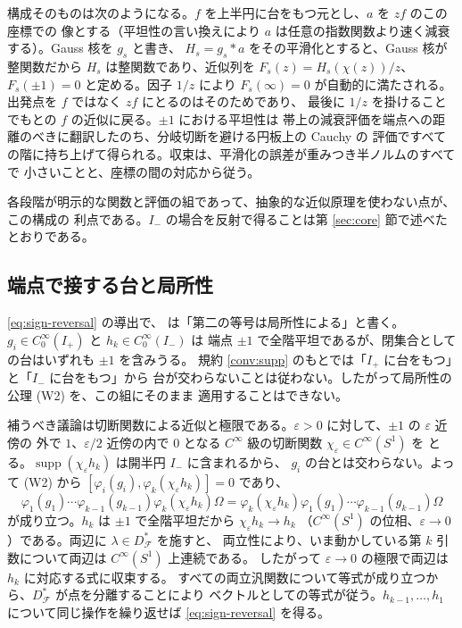 \documentclass[11pt,a4paper]{article}
\newcommand{\Circ}{S^{1}}
\newcommand{\Fields}{\mathcal{F}}
\newcommand{\Dom}{D}
\newcommand{\Dstar}{\Dom^{*}_{\Fields}}
\theoremstyle{definition}
\begin{document}
構成そのものは次のようになる。$f$ を上半円に台をもつ元とし、$a$ を $zf$ のこの座標での
像とする（平坦性の言い換えにより $a$ は任意の指数関数より速く減衰する）。Gauss 核を $g_s$ と書き、
$H_s = g_s * a$ をその平滑化とすると、Gauss 核が整関数だから $H_s$ は整関数であり、近似列を
$F_s(z) = H_s(\chi(z))/z$、$F_s(\pm 1) = 0$ と定める。因子 $1/z$ により
$F_s(\infty) = 0$ が自動的に満たされる。出発点を $f$ ではなく $zf$ にとるのはそのためであり、
最後に $1/z$ を掛けることでもとの $f$ の近似に戻る。$\pm 1$ における平坦性は
帯上の減衰評価を端点への距離のべきに翻訳したのち、分岐切断を避ける円板上の Cauchy の
評価ですべての階に持ち上げて得られる。収束は、平滑化の誤差が重みつき半ノルムのすべてで
小さいことと、座標の間の対応から従う。

各段階が明示的な関数と評価の組であって、抽象的な近似原理を使わない点が、この構成の
利点である。$I_-$ の場合を反射で得ることは第 \ref{sec:core} 節で述べたとおりである。

\subsection{端点で接する台と局所性}
\label{sec:locality}

\eqref{eq:sign-reversal} の導出で、\cite{T26} は「第二の等号は局所性による」と書く。
$g_i \in C_0^\infty(I_+)$ と $h_k \in C_0^\infty(I_-)$ は
端点 $\pm 1$ で全階平坦であるが、閉集合としての台はいずれも $\pm 1$ を含みうる。
規約 \ref{conv:supp} のもとでは「$I_+$ に台をもつ」と「$I_-$ に台をもつ」から
台が交わらないことは従わない。したがって局所性の公理 (W2) を、この組にそのまま
適用することはできない。

補うべき議論は切断関数による近似と極限である。$\varepsilon > 0$ に対して、$\pm 1$ の $\varepsilon$ 近傍の
外で $1$、$\varepsilon/2$ 近傍の内で $0$ となる $C^\infty$ 級の切断関数 $\chi_\varepsilon \in C^\infty(\Circ)$ を
とる。$\operatorname{supp}(\chi_\varepsilon h_k)$ は開半円 $I_-$ に含まれるから、
$g_i$ の台とは交わらない。よって (W2) から
$[\varphi_i(g_i), \varphi_k(\chi_\varepsilon h_k)] = 0$ であり、
\[
  \varphi_1(g_1)\cdots\varphi_{k-1}(g_{k-1})\varphi_k(\chi_\varepsilon h_k)\Omega
  = \varphi_k(\chi_\varepsilon h_k)\varphi_1(g_1)\cdots\varphi_{k-1}(g_{k-1})\Omega
\]
が成り立つ。$h_k$ は $\pm 1$ で全階平坦だから $\chi_\varepsilon h_k \to h_k$
（$C^\infty(\Circ)$ の位相、$\varepsilon \to 0$）である。両辺に $\lambda \in \Dstar$ を施すと、
両立性により、いま動かしている第 $k$ 引数について両辺は $C^\infty(\Circ)$ 上連続である。
したがって $\varepsilon \to 0$ の極限で両辺は $h_k$ に対応する式に収束する。
すべての両立汎関数について等式が成り立つから、$\Dstar$ が点を分離することにより
ベクトルとしての等式が従う。$h_{k-1}, \dots, h_1$ について同じ操作を繰り返せば \eqref{eq:sign-reversal} を得る。
\end{document}

